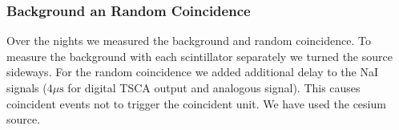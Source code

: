 \subsubsection{Background an Random Coincidence}
Over the nights we measured the background and random coincidence. To
measure the background with each scintillator separately we turned the
\Cs  source sideways. For the random coincidence we added additional
delay to the NaI signals ($4\mu \mathrm{s}$ for digital TSCA output and
analogous signal). This causes coincident events not to trigger the coincident
unit. We have used the cesium source. 

